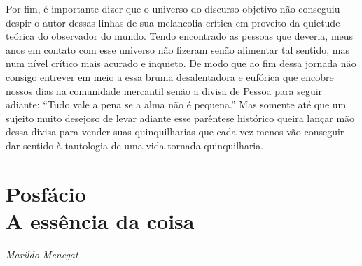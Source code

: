 {Por fim, é importante dizer que o universo do discurso objetivo não
conseguiu despir o autor dessas linhas de sua melancolia crítica em
proveito da quietude teórica do observador do mundo. Tendo encontrado as
pessoas que deveria, meus anos em contato com esse universo não fizeram
senão alimentar tal sentido, mas num nível crítico mais acurado e
inquieto. De modo que ao fim dessa jornada não consigo entrever em meio
a essa bruma desalentadora e eufórica que encobre nossos dias na
comunidade mercantil senão a divisa de Pessoa para seguir adiante:
``Tudo vale a pena se a alma não é pequena.'' Mas somente até que um
sujeito muito desejoso de levar adiante esse parêntese histórico queira
lançar mão dessa divisa para vender suas quinquilharias que cada vez
menos vão conseguir dar sentido à tautologia de uma vida tornada
quinquilharia.

\chapter*{Posfácio\\A essência da coisa}

\begin{flushright}
\emph{Marildo Menegat}
\end{flushright}

}

